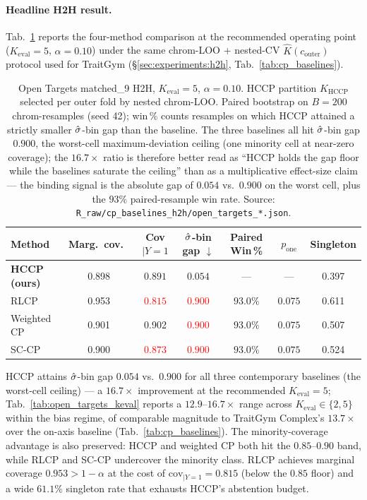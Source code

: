 \paragraph{Headline H2H result.}
Tab.~\ref{tab:open_targets_h2h} reports the four-method comparison at the
recommended operating point ($K_{\mathrm{eval}} = 5$, $\alpha = 0.10$) under
the same chrom-LOO + nested-CV $\hat K(c_{\mathrm{outer}})$ protocol used
for TraitGym (\S\ref{sec:experiments:h2h}, Tab.~\ref{tab:cp_baselines}).

\begin{table}[h]
\centering
\small
\caption{Open Targets matched\_9 H2H, $K_{\mathrm{eval}} = 5$, $\alpha = 0.10$.
HCCP partition $K_{\mathrm{HCCP}}$ selected per outer fold by nested
chrom-LOO. Paired bootstrap on $B = 200$ chrom-resamples (seed 42); win\,\%
counts resamples on which HCCP attained a strictly smaller $\hat{\sigma}$-bin gap
than the baseline. The three baselines all hit $\hat{\sigma}$-bin gap $0.900$, the
worst-cell maximum-deviation ceiling (one minority cell at near-zero
coverage); the $16.7\times$ ratio is therefore better read as ``HCCP holds
the gap floor while the baselines saturate the ceiling'' than as a
multiplicative effect-size claim — the binding signal is the absolute gap
of $0.054$ vs.\ $0.900$ on the worst cell, plus the $93\%$ paired-resample
win rate. Source: \texttt{R\_raw/cp\_baselines\_h2h/open\_targets\_*.json}.}
\label{tab:open_targets_h2h}
\setlength{\tabcolsep}{4pt}
\begin{tabular}{lcccccc}
\toprule
Method & Marg.\ cov.\ & Cov$|Y{=}1$ & $\hat{\sigma}$-bin gap $\downarrow$
       & Paired Win\,\% & $p_{\mathrm{one}}$ & Singleton \\
\midrule
\textbf{HCCP (ours)} & 0.898 & $0.891$ & $\mathbf{0.054}$ & --- & --- & 0.397 \\
RLCP                 & 0.953 & \textcolor{red}{$0.815$} & \textcolor{red}{$0.900$}
                     & $93.0\%$ & $0.075$ & 0.611 \\
Weighted CP          & 0.901 & 0.902 & \textcolor{red}{$0.900$}
                     & $93.0\%$ & $0.075$ & 0.507 \\
SC-CP                & 0.900 & \textcolor{red}{$0.873$} & \textcolor{red}{$0.900$}
                     & $93.0\%$ & $0.075$ & 0.524 \\
\bottomrule
\end{tabular}
\end{table}

HCCP attains $\hat{\sigma}$-bin gap $0.054$ vs.\ $0.900$ for all three contemporary
baselines (the worst-cell ceiling) — a $16.7\times$ improvement at the
recommended $K_{\mathrm{eval}} = 5$;
Tab.~\ref{tab:open_targets_keval} reports a $12.9$--$16.7\times$ range across
$K_{\mathrm{eval}} \in \{2, 5\}$ within the bias regime, of comparable
magnitude to TraitGym Complex's $13.7\times$ over the on-axis baseline
(Tab.~\ref{tab:cp_baselines}). The minority-coverage advantage is also
preserved: HCCP and weighted CP both hit the $0.85$--$0.90$ band, while
RLCP and SC-CP undercover the minority class. RLCP achieves marginal
coverage $0.953 > 1 - \alpha$ at the cost of $\mathrm{cov}_{|Y=1} = 0.815$
(below the $0.85$ floor) and a wide $61.1\%$ singleton rate that exhausts
HCCP's abstention budget.


